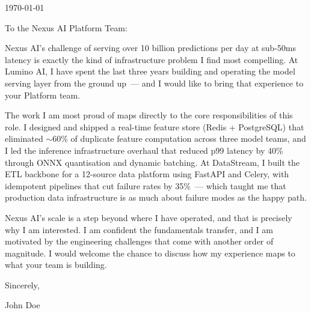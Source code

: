 \documentclass{ExpressiveCoverLetter}
\begin{document}
\coverletterheader[
    firstname=John,
    lastname=Doe,
    email=john.doe@example.com,
    phone=+1-555-012-3456,
    linkedin=johndoe,
    github=johndoe,
    city=San Francisco,
    state=CA
]

\vspace{0.25in}
\today
\vspace{0.15in}

To the Nexus AI Platform Team:

Nexus AI's challenge of serving over 10 billion predictions per day at
sub-50ms latency is exactly the kind of infrastructure problem I find most
compelling. At Lumino AI, I have spent the last three years building and
operating the model serving layer from the ground up~--- and I would like
to bring that experience to your Platform team.

The work I am most proud of maps directly to the core responsibilities of
this role. I designed and shipped a real-time feature store (Redis +
PostgreSQL) that eliminated $\sim$60\% of duplicate feature computation
across three model teams, and I led the inference infrastructure overhaul
that reduced p99 latency by 40\% through ONNX quantisation and dynamic
batching. At DataStream, I built the ETL backbone for a 12-source data
platform using FastAPI and Celery, with idempotent pipelines that cut
failure rates by 35\%~--- which taught me that production data
infrastructure is as much about failure modes as the happy path.

Nexus AI's scale is a step beyond where I have operated, and that is
precisely why I am interested. I am confident the fundamentals transfer,
and I am motivated by the engineering challenges that come with another
order of magnitude. I would welcome the chance to discuss how my
experience maps to what your team is building.

Sincerely,

\vspace{.15in}

John Doe
\end{document}
